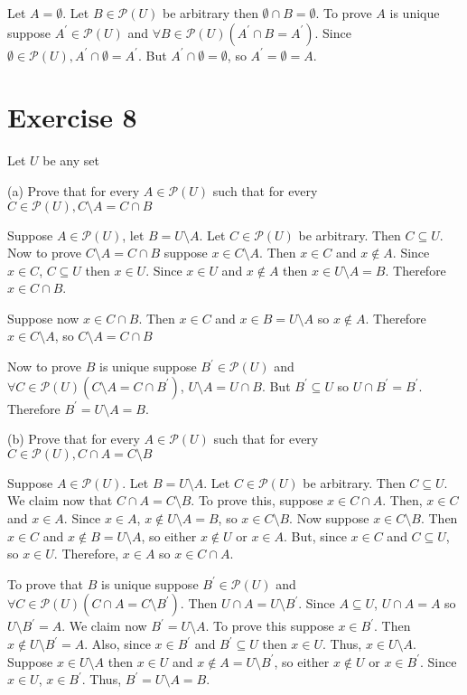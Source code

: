 \documentclass[11pt]{article}
\newcommand{\powerset}[1]{\mathscr{P}(#1)}
\begin{document}
Let $A = \emptyset$. Let $B \in \powerset{U}$ be arbitrary then 
$\emptyset \cap B = \emptyset$. To prove $A$ is unique suppose 
$A^\prime \in \powerset{U}$ and 
$\forall B \in \powerset{U} (A^\prime \cap B = A^\prime)$. Since 
$\emptyset \in \powerset{U}, A^\prime \cap \emptyset = A^\prime$. But 
$A^\prime \cap \emptyset = \emptyset$, so $A^\prime = \emptyset = A$.

\section*{Exercise 8}

Let $U$ be any set 

\noindent (a) Prove that for every $A \in \powerset{U}$ such that for every 
$C \in \powerset{U}, C \setminus A = C \cap B$

Suppose $A \in \powerset{U}$, let $B = U \setminus A$. Let $C \in \powerset{U}$
be arbitrary. Then $C \subseteq U$. Now to prove $C \setminus A = C \cap B$
suppose $x \in C \setminus A$. Then $x \in C$ and $x \notin A$. Since 
$x \in C$, $C \subseteq U$ then $x \in U$. Since $x \in U$ and $x \notin A$ 
then $x \in U \setminus A = B$. Therefore $x \in C \cap B$. 

Suppose now $x \in C \cap B$. Then $x \in C$ and $x \in B = U \setminus A$ so 
$x \notin A$. Therefore $x \in C \setminus A$, so $C \setminus A = C \cap B$

Now to prove $B$ is unique suppose $B^\prime \in \powerset{U}$ and 
$\forall C \in \powerset{U} (C \setminus A = C \cap B^\prime)$, 
$U \setminus A = U \cap B$. But $B^\prime \subseteq U$ so 
$U \cap B^\prime = B^\prime$. Therefore $B^\prime = U \setminus A = B$.

\noindent (b) Prove that for every $A \in \powerset{U}$ such that for every 
$C \in \powerset{U}, C \cap A = C \setminus B$

Suppose $A \in \powerset{U}$. Let $B = U \setminus A$. Let $C \in \powerset{U}$
be arbitrary. Then $C \subseteq U$. We claim now that $C \cap A = C \setminus B$.
To prove this, suppose $x \in C \cap A$. Then, $x \in C$ and $x \in A$. Since 
$x \in A$, $x \notin U \setminus A = B$, so $x \in C \setminus B$. Now suppose 
$x \in C \setminus B$. Then $x \in C$ and $x \notin B = U \setminus A$, so 
either $x \notin U$ or $x \in A$. But, since $x \in C$ and $C \subseteq U$,
so $x \in U$. Therefore, $x \in A$ so $x \in C \cap A$.

To prove that $B$ is unique suppose $B^\prime \in \powerset{U}$ and 
$\forall C \in \powerset{U} (C \cap A = C \setminus B^\prime)$. Then 
$U \cap A = U \setminus B^\prime$. Since $A \subseteq U$, $U \cap A = A$ so 
$U \setminus B^\prime = A$. We claim now $B^\prime = U \setminus A$. To prove 
this suppose $x \in B^\prime$. Then $x \notin U \setminus B^\prime = A$. Also,
since $x \in B^\prime$ and $B^\prime \subseteq U$ then $x \in U$. Thus, 
$x \in U \setminus A$. Suppose $x \in U \setminus A$ then 
$x \in U$ and $x \notin A = U \setminus B^\prime$, so either $x \notin U$ or 
$x \in B^\prime$. Since $x \in U$, $x \in B^\prime$. Thus, 
$B^\prime = U \setminus A = B$.
\end{document}
